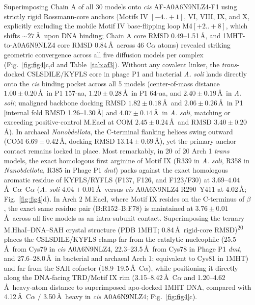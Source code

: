 \documentclass[10pt,letterpaper]{article}
\newcommand{\spname}[1]{\textit{#1}}
\newcommand{\gene}[1]{\textit{#1}}
\newcommand{\refsup}[1]{\textsuperscript{#1}}
\begin{document}
Superimposing Chain A of all 30 models onto \textit{cis} AF-A0A6N9NLZ4-F1 using strictly rigid Rossmann-core anchors (Motifs IV $[-4..+1]$, VI, VIII, IX, and X, explicitly excluding the mobile Motif IV base-flipping loop M4$[+2..+8]$, which shifts $\sim 27$\,\AA\ upon DNA binding; Chain A core RMSD 0.49--1.51\,\AA, and 1MHT-to-A0A6N9NLZ4 core RMSD 0.84\,\AA\ across 46 C$\alpha$ atoms) revealed striking geometric convergence across all five diffusion models per complex (Fig.~\ref{fig:fig4}c,d and Table~\ref{tab:af3}). Without any covalent linker, the \textit{trans}-docked CSLSDILE/KYFLS core in phage P1 and bacterial \spname{A. soli} lands directly onto the \textit{cis} binding pocket across all 5 models (center-of-mass distance $1.00 \pm 0.20$\,\AA\ in P1 157-aa, $1.20 \pm 0.28$\,\AA\ in P1 64-aa, and $2.40 \pm 0.19$\,\AA\ in \spname{A. soli}; unaligned backbone docking RMSD $1.82 \pm 0.18$\,\AA\ and $2.06 \pm 0.26$\,\AA\ in P1 [internal fold RMSD 1.26--1.30\,\AA] and $4.07 \pm 0.14$\,\AA\ in \spname{A. soli}, matching or exceeding positive-control M.EaeI at COM $2.45 \pm 0.24$\,\AA\ and RMSD $3.40 \pm 0.20$\,\AA). In archaeal \spname{Nanobdellota}, the C-terminal flanking helices swing outward (COM $6.69 \pm 0.42$\,\AA, docking RMSD $13.14 \pm 0.69$\,\AA), yet the primary anchor contact remains locked in place. Most remarkably, in 20 of 20 Arch 1 \textit{trans} models, the exact homologous first arginine of Motif IX (R339 in \spname{A. soli}, R358 in \spname{Nanobdellota}, R385 in Phage P1 \gene{dmt}) packs against the exact homologous aromatic residue of KYFLS/RYFLS (F137, F126, and F123/F30) at $3.69$--$4.04$\,\AA\ C$\alpha$--C$\alpha$ (\spname{A. soli} $4.04 \pm 0.01$\,\AA\ versus \textit{cis} A0A6N9NLZ4 R290--Y411 at 4.02\,\AA; Fig.~\ref{fig:fig4}d). In Arch 2 M.EaeI, where Motif IX resides on the C-terminus of $\beta$, the exact same residue pair (B:R152--B:F78) is maintained at $3.76 \pm 0.01$\,\AA\ across all five models as an intra-subunit contact. Superimposing the ternary M.HhaI--DNA--SAH crystal structure (PDB 1MHT; 0.84\,\AA\ rigid-core RMSD)\refsup{20} places the CSLSDILE/KYFLS clamp far from the catalytic nucleophile (25.5\,\AA\ from Cys79 in \textit{cis} A0A6N9NLZ4, 22.3--23.5\,\AA\ from Cys78 in Phage P1 \gene{dmt}, and 27.6--28.0\,\AA\ in bacterial and archaeal Arch 1; equivalent to Cys81 in 1MHT) and far from the SAH cofactor (18.9--19.5\,\AA\ C$\alpha$), while positioning it directly along the DNA-facing TRD/Motif IX rim (3.15--8.42\,\AA\ C$\alpha$ and 1.20--4.62\,\AA\ heavy-atom distance to superimposed apo-docked 1MHT DNA, compared with 4.12\,\AA\ C$\alpha$ / 3.50\,\AA\ heavy in \textit{cis} A0A6N9NLZ4; Fig.~\ref{fig:fig4}c).
\end{document}
